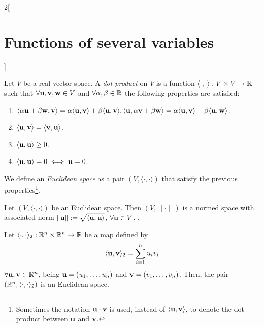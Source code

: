 \documentclass[../../../main.tex]{subfiles}
\begin{document}
\begin{multicols}{2}[\section{Functions of several variables}]
\begin{prop}
    \end{prop}
    \begin{definition}
        Let $V$ be a real vector space. A \textit{dot product} on $V$ is a function $\langle\cdot,\cdot\rangle:V\times V\rightarrow\mathbb{R} $ such that $\forall \vb{u},\vb{v},\vb{w}\in V$ and $\forall\alpha,\beta\in\mathbb{R} $ the following properties are satisfied:
        \begin{enumerate}
            \item $\langle \alpha \vb{u}+\beta \vb{w},\vb{v}\rangle=\alpha\langle \vb{u},\vb{v}\rangle+\beta\langle \vb{u},\vb{v}\rangle,\\\langle \vb{u},\alpha \vb{v}+\beta \vb{w}\rangle=\alpha\langle \vb{u},\vb{v}\rangle+\beta\langle \vb{u},\vb{w}\rangle$.
            \item $\langle \vb{u},\vb{v}\rangle=\langle \vb{v},\vb{u}\rangle$.
            \item $\langle \vb{u},\vb{u}\rangle\geq 0$.
            \item $\langle \vb{u},\vb{u}\rangle=0\iff \vb{u}=0$.
        \end{enumerate}
        We define an \textit{Euclidean space} as a pair $(V,\langle\cdot,\cdot\rangle)$ that satisfy the previous properties\footnote{Sometimes the notation $\vb{u}\cdot \vb{v}$ is used, instead of $\langle \vb{u},\vb{v}\rangle$, to denote the dot product between $\vb{u}$ and $\vb{v}$.}.
    \end{definition}
    \begin{prop}
        Let $(V,\langle\cdot,\cdot\rangle)$ be an Euclidean space. Then $(V,\|\cdot\|)$ is a normed space with associated norm $\|\vb{u}\|:=\sqrt{\langle \vb{u},\vb{u}\rangle}$, $\forall \vb{u}\in V$. .
    \end{prop}
    \begin{prop}
        Let $\langle\cdot,\cdot\rangle_2:\mathbb{R}^n\times\mathbb{R}^n\rightarrow\mathbb{R} $ be a map defined by $$\langle \vb{u},\vb{v}\rangle_2=\sum_{i=1}^nu_iv_i$$ $\forall \vb{u},\vb{v}\in \mathbb{R}^n$, being $\vb{u}=(u_1,\ldots,u_n)$ and $\vb{v}=(v_1,\ldots,v_n)$. Then, the pair $(\mathbb{R}^n,\langle\cdot,\cdot\rangle_2)$ is an Euclidean space.
    \end{prop}
    \begin{corollary}

\end{corollary}
\end{multicols}
\end{document}
